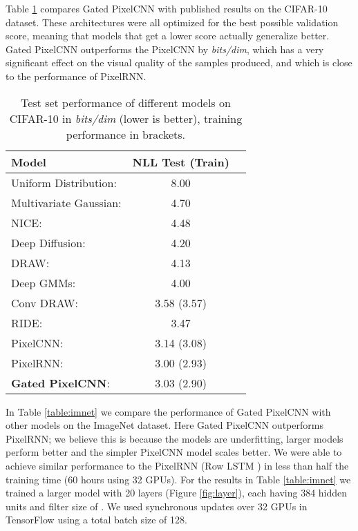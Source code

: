 \documentclass{article}
\begin{document}
Table \ref{table:cifar10} compares Gated PixelCNN with published results on the CIFAR-10 dataset. These architectures were all optimized for the best possible validation score, meaning that models that get a lower score actually generalize better. Gated PixelCNN outperforms the PixelCNN by  \emph{bits/dim}, which has a very significant effect on the visual quality of the samples produced, and which is close to the performance of PixelRNN.
\begin{table}[h]
\centering
  \begin{tabular}{lcc}
    \toprule
    \textbf{Model} & \textbf{NLL Test (Train)}  \\ 
    \midrule
    Uniform Distribution: \cite{van2016pixel} & 8.00 \\ 
    Multivariate Gaussian: \cite{van2016pixel} & 4.70 \\ 
    NICE: \cite{dinh2014nice} & 4.48 \\ 
    Deep Diffusion: \cite{deepdiffusion} & 4.20 \\ 
    DRAW: \cite{gregor2015draw} & 4.13 \\
    Deep GMMs: \cite{van2014factoring,7028865} & 4.00 \\
    Conv DRAW: \cite{conceptcompression} & 3.58 (3.57) \\
    RIDE: \cite{theis2015generative,van2016pixel} & 3.47 \\ 
    PixelCNN: \cite{van2016pixel} & 3.14 (3.08) \\ 
    PixelRNN: \cite{van2016pixel} \quad\quad\quad\quad\quad\quad\quad & 3.00 (2.93) \\ 
    \midrule
    \textbf{Gated PixelCNN}: & 3.03 (2.90) \\
      \bottomrule
  \end{tabular}
\vspace{5pt}
\caption{Test set performance of different models on CIFAR-10 in \emph{bits/dim} (lower is better), training performance in brackets.}
\label{table:cifar10}
\end{table}

In Table \ref{table:imnet} we compare the performance of Gated PixelCNN with other models on the ImageNet dataset. Here Gated PixelCNN outperforms PixelRNN; we believe this is because the models are underfitting, larger models perform better and the simpler PixelCNN model scales better. We were able to achieve similar performance to the PixelRNN (Row LSTM \cite{van2016pixel}) in less than half the training time (60 hours using 32 GPUs). 
For the results in Table \ref{table:imnet} we trained a larger model with 20 layers (Figure \ref{fig:layer}), each having 384 hidden units and filter size of . We used  synchronous updates over 32 GPUs in TensorFlow \cite{abadi2016tensorflow} using a total batch size of 128.
\end{document}
